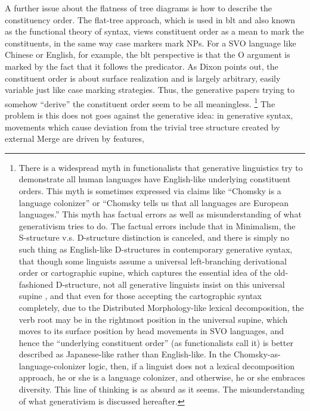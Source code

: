 \documentclass[../main.tex]{subfiles}
\begin{document}
A further issue about the flatness of tree diagrams is how to describe the constituency order.
The flat-tree approach, which is used in \ac{blt} and also known as the functional theory of syntax,
views constituent order as a mean to mark the constituents,
in the same way case markers mark NPs.
For a SVO language like Chinese or English, for example, 
the \ac{blt} perspective is that the O argument is marked by 
the fact that it follows the predicator.
As Dixon points out, the constituent order is about surface realization and is largely arbitrary,
easily variable just like case marking strategies.
Thus, the generative papers trying to somehow ``derive'' the constituent order
seem to be all meaningless.%
\footnote{
    There is a widespread myth in functionalists that 
    generative linguistics try to demonstrate 
    all human languages have English-like underlying constituent orders.
    This myth is sometimes expressed via claims like 
    ``Chomsky is a language colonizer'' or 
    ``Chomsky tells us that all languages are European languages.''
    This myth has factual errors as well as misunderstanding of what generativism tries to do.
    The factual errors include 
    that in Minimalism, the S-structure v.s. D-structure distinction is canceled,
    and there is simply no such thing as English-like D-structures in contemporary generative syntax,
    that though some linguists assume a universal left-branching derivational order 
    or cartographic supine,
    which captures the essential idea of the old-fashioned D-structure,
    not all generative linguists insist on this universal supine \citep{wiltschko2014universal},
    and that even for those accepting the cartographic syntax completely,
    due to the Distributed Morphology-like lexical decomposition,
    the verb root may be in the rightmost position in the universal supine,
    which moves to its surface position by head movements in SVO languages,
    and hence the ``underlying constituent order'' (as functionalists call it)
    is better described as Japanese-like rather than English-like.
    In the Chomsky-as-language-colonizer logic, then,
    if a linguist does not a lexical decomposition approach, he or she is a language colonizer,
    and otherwise, he or she embraces diversity.
    This line of thinking is as absurd as it seems.
    The misunderstanding of what generativism is discussed hereafter.
}
The problem is this does not goes against the generative idea:
in generative syntax, movements which cause deviation 
from the trivial tree structure created by external Merge 
are driven by features, 
\end{document}
